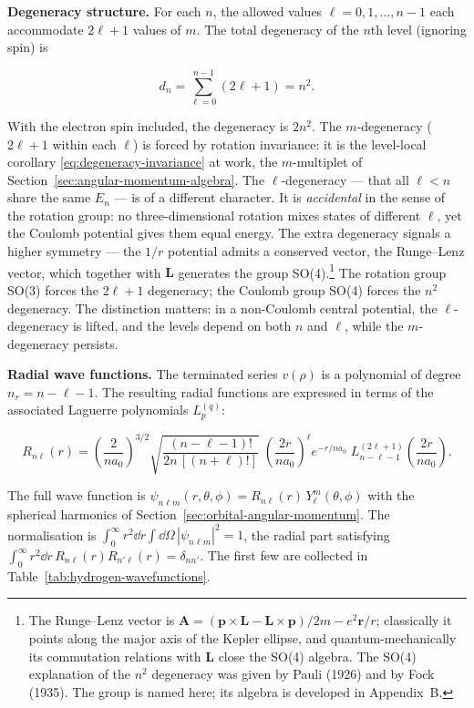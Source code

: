 \medskip\noindent\textbf{Degeneracy structure.} For each $n$, the allowed values $\ell = 0,1,\ldots,n-1$ each accommodate $2\ell+1$ values of $m$. The total degeneracy of the $n$th level (ignoring spin) is
\begin{linenomath}
\begin{equation*}
d_n = \sum_{\ell=0}^{n-1} (2\ell+1) = n^2 .
\end{equation*}
\end{linenomath}
With the electron spin included, the degeneracy is $2n^2$. The $m$-degeneracy ($2\ell+1$ within each $\ell$) is forced by rotation invariance: it is the level-local corollary \eqref{eq:degeneracy-invariance} at work, the $m$-multiplet of Section~\ref{sec:angular-momentum-algebra}. The $\ell$-degeneracy --- that all $\ell < n$ share the same $E_n$ --- is of a different character. It is \emph{accidental} in the sense of the rotation group: no three-dimensional rotation mixes states of different $\ell$, yet the Coulomb potential gives them equal energy. The extra degeneracy signals a higher symmetry --- the $1/r$ potential admits a conserved vector, the Runge--Lenz vector, which together with $\bm L$ generates the group SO(4).\footnote{The Runge--Lenz vector is $\bm A = (\bm p\times\bm L - \bm L\times\bm p)/2m - e^2\bm r/r$; classically it points along the major axis of the Kepler ellipse, and quantum-mechanically its commutation relations with $\bm L$ close the SO(4) algebra. The SO(4) explanation of the $n^2$ degeneracy was given by Pauli (1926) and by Fock (1935). The group is named here; its algebra is developed in Appendix~B.} The rotation group SO(3) forces the $2\ell+1$ degeneracy; the Coulomb group SO(4) forces the $n^2$ degeneracy. The distinction matters: in a non-Coulomb central potential, the $\ell$-degeneracy is lifted, and the levels depend on both $n$ and $\ell$, while the $m$-degeneracy persists.

\medskip\noindent\textbf{Radial wave functions.} The terminated series $v(\rho)$ is a polynomial of degree $n_r = n-\ell-1$. The resulting radial functions are expressed in terms of the associated Laguerre polynomials $L_{p}^{(q)}$:
\begin{linenomath}
\begin{equation}
R_{n\ell}(r)
= \left(\frac{2}{n a_0}\right)^{\!3/2}
\sqrt{\frac{(n-\ell-1)!}{2n\,[(n+\ell)!]}}\;
\left(\frac{2r}{n a_0}\right)^{\!\ell}
e^{-r/na_0}\;
L_{n-\ell-1}^{(2\ell+1)}\!\left(\frac{2r}{n a_0}\right) .
\label{eq:hydrogen-radial-functions}
\end{equation}
\end{linenomath}
The full wave function is $\psi_{n\ell m}(r,\theta,\phi) = R_{n\ell}(r)\,Y_\ell^m(\theta,\phi)$ with the spherical harmonics of Section~\ref{sec:orbital-angular-momentum}. The normalisation is $\int_0^\infty r^2\dd r\int\dd\Omega\,|\psi_{n\ell m}|^2 = 1$, the radial part satisfying $\int_0^\infty r^2\dd r\,R_{n\ell}(r)R_{n'\ell}(r) = \delta_{nn'}$. The first few are collected in Table~\ref{tab:hydrogen-wavefunctions}.

